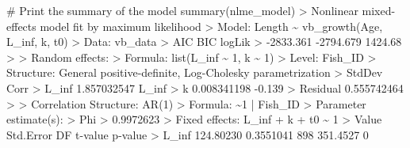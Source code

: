\documentclass[
  letterpaper,
]{book}
\newenvironment{Shaded}{\begin{snugshade}}{\end{snugshade}}
\newcommand{\CommentTok}[1]{\textcolor[rgb]{0.37,0.37,0.37}{#1}}
\newcommand{\DecValTok}[1]{\textcolor[rgb]{0.68,0.00,0.00}{#1}}
\newcommand{\ErrorTok}[1]{\textcolor[rgb]{0.68,0.00,0.00}{#1}}
\newcommand{\FloatTok}[1]{\textcolor[rgb]{0.68,0.00,0.00}{#1}}
\newcommand{\FunctionTok}[1]{\textcolor[rgb]{0.28,0.35,0.67}{#1}}
\newcommand{\NormalTok}[1]{\textcolor[rgb]{0.00,0.23,0.31}{#1}}
\newcommand{\SpecialCharTok}[1]{\textcolor[rgb]{0.37,0.37,0.37}{#1}}
\begin{document}
\begin{Shaded}
\begin{Highlighting}[]
\CommentTok{\# Print the summary of the model}
\FunctionTok{summary}\NormalTok{(nlme\_model)}
\SpecialCharTok{\textgreater{}}\NormalTok{ Nonlinear mixed}\SpecialCharTok{{-}}\NormalTok{effects model fit by maximum likelihood}
\SpecialCharTok{\textgreater{}}\NormalTok{   Model}\SpecialCharTok{:}\NormalTok{ Length }\SpecialCharTok{\textasciitilde{}} \FunctionTok{vb\_growth}\NormalTok{(Age, L\_inf, k, t0) }
\SpecialCharTok{\textgreater{}}\NormalTok{   Data}\SpecialCharTok{:}\NormalTok{ vb\_data }
\SpecialCharTok{\textgreater{}}\NormalTok{         AIC       BIC  logLik}
\SpecialCharTok{\textgreater{}}   \SpecialCharTok{{-}}\FloatTok{2833.361} \SpecialCharTok{{-}}\FloatTok{2794.679} \FloatTok{1424.68}
\SpecialCharTok{\textgreater{}} 
\ErrorTok{\textgreater{}}\NormalTok{ Random effects}\SpecialCharTok{:}
\ErrorTok{\textgreater{}}\NormalTok{  Formula}\SpecialCharTok{:} \FunctionTok{list}\NormalTok{(L\_inf }\SpecialCharTok{\textasciitilde{}} \DecValTok{1}\NormalTok{, k }\SpecialCharTok{\textasciitilde{}} \DecValTok{1}\NormalTok{)}
\SpecialCharTok{\textgreater{}}\NormalTok{  Level}\SpecialCharTok{:}\NormalTok{ Fish\_ID}
\SpecialCharTok{\textgreater{}}\NormalTok{  Structure}\SpecialCharTok{:}\NormalTok{ General positive}\SpecialCharTok{{-}}\NormalTok{definite, Log}\SpecialCharTok{{-}}\NormalTok{Cholesky parametrization}
\SpecialCharTok{\textgreater{}}\NormalTok{          StdDev      Corr  }
\SpecialCharTok{\textgreater{}}\NormalTok{ L\_inf    }\FloatTok{1.857032547}\NormalTok{ L\_inf }
\SpecialCharTok{\textgreater{}}\NormalTok{ k        }\FloatTok{0.008341198} \SpecialCharTok{{-}}\FloatTok{0.139}
\SpecialCharTok{\textgreater{}}\NormalTok{ Residual }\FloatTok{0.555742464}       
\SpecialCharTok{\textgreater{}} 
\ErrorTok{\textgreater{}}\NormalTok{ Correlation Structure}\SpecialCharTok{:} \FunctionTok{AR}\NormalTok{(}\DecValTok{1}\NormalTok{)}
\SpecialCharTok{\textgreater{}}\NormalTok{  Formula}\SpecialCharTok{:} \ErrorTok{\textasciitilde{}}\DecValTok{1} \SpecialCharTok{|}\NormalTok{ Fish\_ID }
\SpecialCharTok{\textgreater{}}\NormalTok{  Parameter }\FunctionTok{estimate}\NormalTok{(s)}\SpecialCharTok{:}
\ErrorTok{\textgreater{}}\NormalTok{       Phi }
\SpecialCharTok{\textgreater{}} \FloatTok{0.9972623} 
\SpecialCharTok{\textgreater{}}\NormalTok{ Fixed effects}\SpecialCharTok{:}\NormalTok{  L\_inf }\SpecialCharTok{+}\NormalTok{ k }\SpecialCharTok{+}\NormalTok{ t0 }\SpecialCharTok{\textasciitilde{}} \DecValTok{1} 
\SpecialCharTok{\textgreater{}}\NormalTok{           Value Std.Error  DF  t}\SpecialCharTok{{-}}\NormalTok{value p}\SpecialCharTok{{-}}\NormalTok{value}
\SpecialCharTok{\textgreater{}}\NormalTok{ L\_inf }\FloatTok{124.80230} \FloatTok{0.3551041} \DecValTok{898} \FloatTok{351.4527}       \DecValTok{0}

\end{Highlighting}
\end{Shaded}
\end{document}
